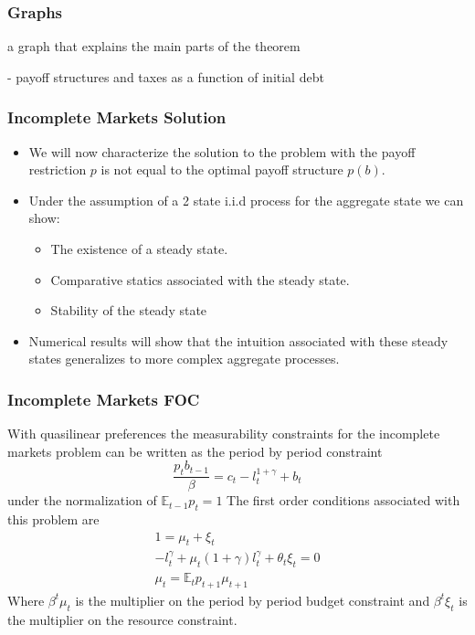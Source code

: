 \documentclass{beamer}
\newcommand{\EE}{\mathbb E}
\begin{document}
  \begin{frame}
   \frametitle{Graphs }
    a graph that explains the main parts of the theorem
   
   - payoff structures and taxes as a function of initial debt
  \end{frame}

\begin{frame}
	\frametitle{Incomplete Markets Solution}
	\begin{itemize}
		\item  We will now characterize the solution to the problem with the payoff restriction $p$ is not equal to the optimal payoff structure $p(b)$. 
		\item  Under the assumption of a 2 state i.i.d process for the aggregate state we can show:
		\begin{itemize}
			\item  The existence of a steady state.
			\item  Comparative statics associated with the steady state.
			\item  Stability of the steady state
		\end{itemize}
		\item  Numerical results will show that the intuition associated with these steady states generalizes to more complex aggregate processes.
	\end{itemize}
\end{frame}  
  
\begin{frame}
 	\frametitle{Incomplete Markets FOC}
	With quasilinear preferences the measurability constraints for the incomplete markets problem can be written as the period by period constraint
	\[
		\frac{p_t b_{t-1}}\beta = c_t - l_t^{1+\gamma} + b_t 
	\]under the normalization of $\EE_{t-1} p_t = 1$  The first order conditions associated with this problem are
	\begin{align*}
		1 = \mu_t + \xi_t\\
		-l_t^\gamma+\mu_t(1+\gamma)l_t^\gamma+\theta_t\xi_t = 0\\
		\mu_t = \EE_t p_{t+1}\mu_{t+1}
	\end{align*}  Where $\beta^t\mu_t$ is the multiplier on the period by period budget constraint and $\beta^t\xi_t$ is the multiplier on the resource constraint.
\end{frame}
\end{document}

